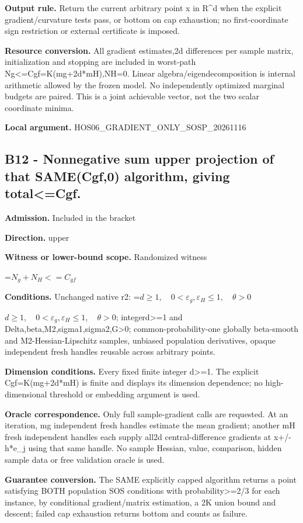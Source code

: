 \documentclass[10pt,a4paper]{article}
\newcommand{\AtlasMath}[1]{\par\begingroup\centering\setbox0=\hbox{$\displaystyle #1$}\ifdim\wd0>1.4\linewidth\typeout{ATLAS WIDE FORMULA: \the\wd0}\fi\ifdim\wd0>\linewidth\resizebox{\linewidth}{!}{\box0}\else\box0\fi\par\endgroup}
\newcommand{\AtlasInlineMath}[1]{\begingroup\setbox0=\hbox{$#1$}\ifdim\wd0>.4\linewidth\endgroup\AtlasMath{#1}\else\endgroup$#1$\fi}
\begin{document}
\textbf{Output rule.} Return the current arbitrary point x in R\textasciicircum{}d when the explicit gradient/curvature tests pass, or bottom on cap exhaustion; no first-coordinate sign restriction or external certificate is imposed.

\textbf{Resource conversion.} All gradient estimates,2d differences per sample matrix, initialization and stopping are included in worst-path Ng<=Cgf=K(mg+2d*mH),NH=0. Linear algebra/eigendecomposition is internal arithmetic allowed by the frozen model. No independently optimized marginal budgets are paired. This is a joint achievable vector, not the two scalar coordinate minima.

\textbf{Local argument.} HOS06\_\allowbreak{}GRADIENT\_\allowbreak{}ONLY\_\allowbreak{}SOSP\_\allowbreak{}20261116

\subsection{B12 - Nonnegative sum upper projection of that SAME(Cgf,0) algorithm, giving total<=Cgf.}
\textbf{Admission.} Included in the bracket

\textbf{Direction.} upper

\textbf{Witness or lower-bound scope.} Randomized witness

\AtlasMath{N_g+N_H<=C_{gf}}
\textbf{Conditions.} Unchanged native r2: \AtlasInlineMath{d\ge1,\quad0<\varepsilon_g,\varepsilon_H\le1,\quad\theta>0}; integerd>=1 and Delta,beta,M2,sigma1,sigma2,G>0; common-probability-one globally beta-smooth and M2-Hessian-Lipschitz samples, unbiased population derivatives, opaque independent fresh handles reusable across arbitrary points.

\textbf{Dimension conditions.} Every fixed finite integer d>=1. The explicit Cgf=K(mg+2d*mH) is finite and displays its dimension dependence; no high-dimensional threshold or embedding argument is used.

\textbf{Oracle correspondence.} Only full sample-gradient calls are requested. At an iteration, mg independent fresh handles estimate the mean gradient; another mH fresh independent handles each supply all2d central-difference gradients at x+/-h*e\_\allowbreak{}j using that same handle. No sample Hessian, value, comparison, hidden sample data or free validation oracle is used.

\textbf{Guarantee conversion.} The SAME explicitly capped algorithm returns a point satisfying BOTH population SOS conditions with probability>=2/3 for each instance, by conditional gradient/matrix estimation, a 2K union bound and descent; failed cap exhaustion returns bottom and counts as failure.
\end{document}
